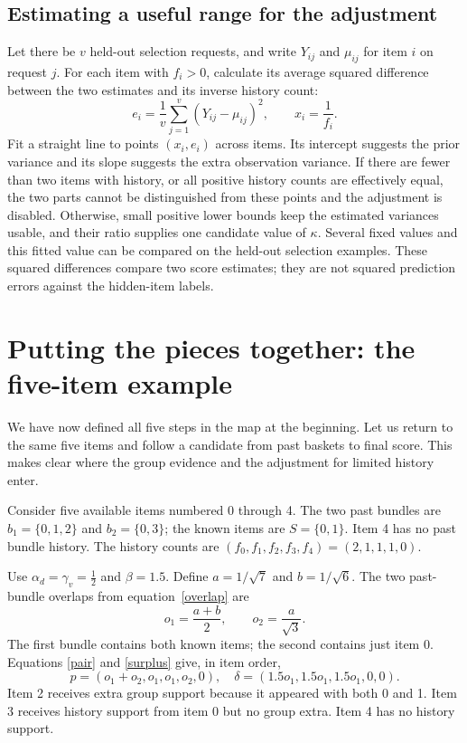 \documentclass[11pt,a4paper]{article}
\numberwithin{equation}{section}
\begin{document}
\subsection{Estimating a useful range for the adjustment}
Let there be $v$ held-out selection requests, and write $Y_{ij}$ and $\mu_{ij}$ for item
$i$ on request $j$. For each item with $f_i>0$, calculate its average squared difference
between the two estimates and its inverse history count:
\begin{equation}
 e_i=\frac1v\sum_{j=1}^{v}(Y_{ij}-\mu_{ij})^2,\qquad x_i=\frac1{f_i}.
\end{equation}
Fit a straight line to points $(x_i,e_i)$ across items. Its intercept suggests the prior
variance and its slope suggests the extra observation variance. If there are fewer than two
items with history, or all positive history counts are effectively equal, the two parts
cannot be distinguished from these points and the adjustment is disabled. Otherwise,
small positive lower bounds keep the estimated variances usable, and their ratio supplies
one candidate value of $\kappa$. Several fixed values and this fitted value can be compared
on the held-out selection examples. These squared differences compare two score estimates;
they are not squared prediction errors against the hidden-item labels.

\section{Putting the pieces together: the five-item example}\label{example}
We have now defined all five steps in the map at the beginning. Let us return to the same
five items and follow a candidate from past baskets to final score. This makes clear where
the group evidence and the adjustment for limited history enter.

Consider five available items numbered 0 through 4. The two past bundles are
$b_1=\{0,1,2\}$ and $b_2=\{0,3\}$; the known items are $S=\{0,1\}$. Item 4 has no past
bundle history. The history counts are $(f_0,f_1,f_2,f_3,f_4)=(2,1,1,1,0)$.

Use $\alpha_d=\gamma_v=\tfrac12$ and $\beta=1.5$. Define $a=1/\sqrt7$ and
$b=1/\sqrt6$. The two past-bundle overlaps from equation~\eqref{overlap} are
\begin{equation}
 o_1=\frac{a+b}{2},\qquad o_2=\frac{a}{\sqrt3}.
\end{equation}
The first bundle contains both known items; the second contains just item 0. Equations
\eqref{pair} and \eqref{surplus} give, in item order,
\begin{equation}
 p=(o_1+o_2,o_1,o_1,o_2,0),\quad
 \delta=(1.5o_1,1.5o_1,1.5o_1,0,0).
\end{equation}
Item 2 receives extra group support because it appeared with both 0 and 1. Item 3 receives
history support from item 0 but no group extra. Item 4 has no history support.
\end{document}
